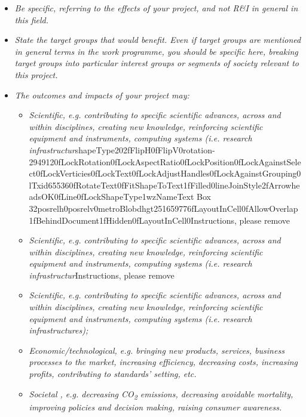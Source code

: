 \begin{itemize}
\item
  \emph{Be specific, referring to the effects of your project, and not
  R\&I in general in this field. }
\item
  \emph{State the target groups that would benefit. Even if target
  groups are mentioned in general terms in the work programme, you
  should be specific here, breaking target groups into particular
  interest groups or segments of society relevant to this project.}
\item
  \emph{The outcomes and impacts of your project may:}

  \begin{itemize}
  \item
    \emph{Scientific, e.g. contributing to specific scientific advances,
    across and within disciplines, creating new knowledge, reinforcing
    scientific equipment and instruments, computing systems (i.e.
    research
    infrastructur}shapeType202fFlipH0fFlipV0rotation-2949120fLockRotation0fLockAspectRatio0fLockPosition0fLockAgainstSelect0fLockVerticies0fLockText0fLockAdjustHandles0fLockAgainstGrouping0lTxid655360fRotateText0fFitShapeToText1fFilled0lineJoinStyle2fArrowheadsOK0fLine0fLockShapeType1wzNameText
    Box
    32posrelh0posrelv0metroBlobdhgt251659776fLayoutInCell0fAllowOverlap1fBehindDocument1fHidden0fLayoutInCell0Instructions,
    please remove
  \item
    \emph{Scientific, e.g. contributing to specific scientific advances,
    across and within disciplines, creating new knowledge, reinforcing
    scientific equipment and instruments, computing systems (i.e.
    research infrastructur}Instructions, please remove
  \item
    \emph{Scientific, e.g. contributing to specific scientific advances,
    across and within disciplines, creating new knowledge, reinforcing
    scientific equipment and instruments, computing systems (i.e.
    research infrastructures);}
  \item
    \emph{Economic/technological, e.g. bringing new products, services,
    business processes to the market, increasing efficiency, decreasing
    costs, increasing profits, contributing to standards' setting, etc.
    }
  \item
    \emph{Societal , e.g. decreasing CO\textsubscript{2} emissions,
    decreasing avoidable mortality, improving policies and decision
    making, raising consumer awareness.}
  \end{itemize}
\end{itemize}

